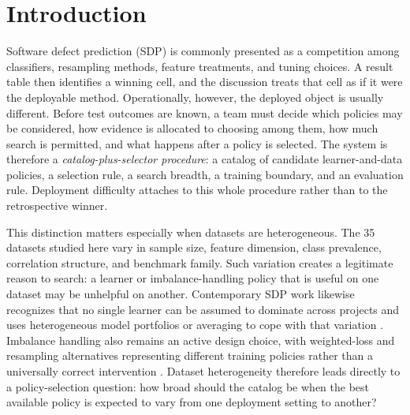 \documentclass[referee]{USG}
\begin{document}

\maketitle

\section{Introduction}
Software defect prediction (SDP) is commonly presented as a competition among classifiers, resampling methods, feature treatments, and tuning choices. A result table then identifies a winning cell, and the discussion treats that cell as if it were the deployable method. Operationally, however, the deployed object is usually different. Before test outcomes are known, a team must decide which policies may be considered, how evidence is allocated to choosing among them, how much search is permitted, and what happens after a policy is selected. The system is therefore a \emph{catalog-plus-selector procedure}: a catalog of candidate learner-and-data policies, a selection rule, a search breadth, a training boundary, and an evaluation rule. Deployment difficulty attaches to this whole procedure rather than to the retrospective winner.

This distinction matters especially when datasets are heterogeneous. The 35 datasets studied here vary in sample size, feature dimension, class prevalence, correlation structure, and benchmark family. Such variation creates a legitimate reason to search: a learner or imbalance-handling policy that is useful on one dataset may be unhelpful on another. Contemporary SDP work likewise recognizes that no single learner can be assumed to dominate across projects and uses heterogeneous model portfolios or averaging to cope with that variation \cite{li2025averaging}. Imbalance handling also remains an active design choice, with weighted-loss and resampling alternatives representing different training policies rather than a universally correct intervention \cite{malhotra2026imbalanced}. Dataset heterogeneity therefore leads directly to a policy-selection question: how broad should the catalog be when the best available policy is expected to vary from one deployment setting to another?
\end{document}
